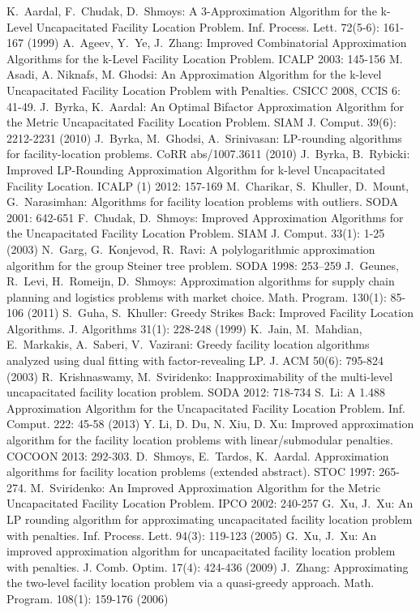 \documentclass{llncs}
\begin{document}
\begin{thebibliography}{99}
 K.~Aardal, F.~Chudak, D.~Shmoys: A 3-Approximation Algorithm for the k-Level Uncapacitated Facility Location Problem. Inf. Process. Lett. 72(5-6): 161-167 (1999)
 A.~Ageev, Y.~Ye, J.~Zhang: Improved Combinatorial Approximation Algorithms for the k-Level Facility Location Problem. ICALP 2003: 145-156
 M. Asadi, A. Niknafs, M. Ghodsi: An Approximation Algorithm for the k-level Uncapacitated Facility Location Problem with Penalties. CSICC 2008, CCIS 6: 41-49.
 J.~Byrka, K.~Aardal: An Optimal Bifactor Approximation Algorithm for the Metric Uncapacitated Facility Location Problem. SIAM J. Comput. 39(6): 2212-2231 (2010)
 J.~Byrka, M.~Ghodsi, A.~Srinivasan: LP-rounding algorithms for facility-location problems. CoRR abs/1007.3611 (2010)
 J.~Byrka, B.~Rybicki: Improved LP-Rounding Approximation Algorithm for k-level Uncapacitated Facility Location. ICALP (1) 2012: 157-169
 M.~Charikar, S.~Khuller, D.~Mount, G.~Narasimhan: Algorithms for facility location problems with outliers. SODA 2001: 642-651
 F.~Chudak, D.~Shmoys: Improved Approximation Algorithms for the Uncapacitated Facility Location Problem. SIAM J. Comput. 33(1): 1-25 (2003)
 N.~Garg, G.~Konjevod, R.~Ravi: A polylogarithmic approximation algorithm for the group Steiner tree problem. SODA 1998: 253–259
 J.~Geunes, R.~Levi, H.~Romeijn, D.~Shmoys: Approximation algorithms for supply chain planning and logistics problems with market choice. Math. Program. 130(1): 85-106 (2011)
 S.~Guha, S.~Khuller: Greedy Strikes Back: Improved Facility Location Algorithms. J. Algorithms 31(1): 228-248 (1999)
 K.~Jain, M.~Mahdian, E.~Markakis, A.~Saberi, V.~Vazirani: Greedy facility location algorithms analyzed using dual fitting with factor-revealing LP. J. ACM 50(6): 795-824 (2003)
 R.~Krishnaswamy, M.~Sviridenko: Inapproximability of the multi-level uncapacitated facility location problem. SODA 2012: 718-734
 S.~Li: A 1.488 Approximation Algorithm for the Uncapacitated Facility Location Problem. Inf. Comput. 222: 45-58 (2013)
 Y. Li, D. Du, N. Xiu, D. Xu: Improved approximation algorithm for the facility location problems with linear/submodular penalties. COCOON 2013: 292-303.
 D.~Shmoys, E.~Tardos, K.~Aardal. Approximation algorithms for facility location problems (extended abstract). STOC 1997: 265-274.
 M.~Sviridenko: An Improved Approximation Algorithm for the Metric Uncapacitated Facility Location Problem. IPCO 2002: 240-257
 G.~Xu, J.~Xu: An LP rounding algorithm for approximating uncapacitated facility location problem with penalties. Inf. Process. Lett. 94(3): 119-123 (2005)
 G.~Xu, J.~Xu: An improved approximation algorithm for uncapacitated facility location problem with penalties. J. Comb. Optim. 17(4): 424-436 (2009)
 J.~Zhang: Approximating the two-level facility location problem via a quasi-greedy approach. Math. Program. 108(1): 159-176 (2006)
\end{thebibliography}
\end{document}
